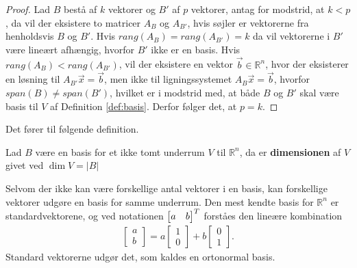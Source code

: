 \begin{proof}
Lad $B$ bestå af $k$ vektorer og $B'$ af $p$ vektorer, antag for modstrid, at $k < p$, da vil der eksistere to matricer $A_{B}$ og $A_{B'}$, hvis søjler er vektorerne fra henholdsvis $B$ og $B'$.
Hvis $rang(A_{B}) = rang(A_{B'}) = k$ da vil vektorerne i $B'$ være lineært afhængig, hvorfor $B'$ ikke er en basis.
Hvis $rang(A_{B}) < rang(A_{B'} )$, vil der eksistere en vektor $\vec{b} \in \mathds{R}^n$, hvor der eksisterer en løsning til $A_{B'}\vec{x} = \vec{b}$, men ikke til ligningssystemet $A_B \vec{x}=\vec{b}$, hvorfor $span(B) \neq span(B')$, hvilket er i modstrid med, at både $B$ og $B'$ skal være basis til $V$ af Definition \ref{def:basis}.
Derfor følger det, at $p=k$.
\end{proof}
Det fører til følgende definition.
\begin{defn}[Dimension]
Lad $B$ være en basis for et ikke tomt underrum $V$ til $\mathds{R}^n$, da er \textbf{dimensionen} af $V$ givet ved $\dim{V} = |B|$
\label{def:dim}
\end{defn}
Selvom der ikke kan være forskellige antal vektorer i en basis, kan forskellige vektorer udgøre en basis for samme underrum.
Den mest kendte basis for $\mathds{R}^n$ er standardvektorene, og ved notationen $\begin{bmatrix} a & b \end{bmatrix}^T$ forståes den lineære kombination
\begin{align*}
\begin{bmatrix} a \\ b \end{bmatrix} = a\begin{bmatrix} 1 \\0 \end{bmatrix} + b \begin{bmatrix} 0 \\ 1 \end{bmatrix}.
\end{align*}
Standard vektorerne udgør det, som kaldes en ortonormal basis.




